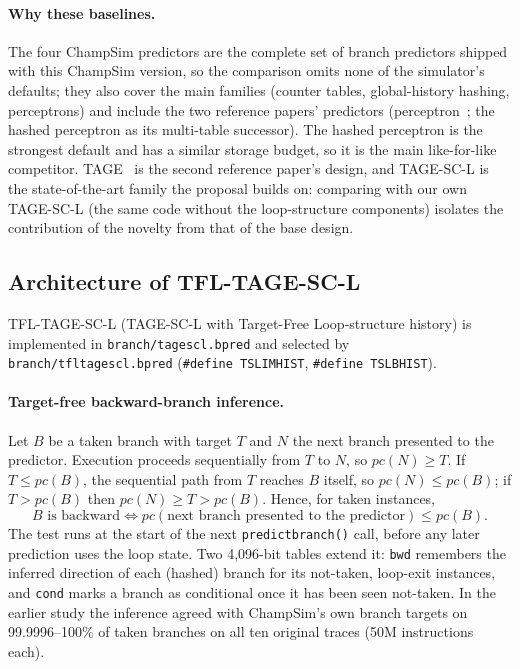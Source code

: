 \documentclass[11pt,a4paper]{article}
\newcommand{\code}[1]{\texttt{#1}}
\newcommand{\prop}{TFL-TAGE-SC-L}
\renewcommand{\_}{\textunderscore\allowbreak}
\begin{document}
\paragraph{Why these baselines.} The four ChampSim predictors are the complete set of branch predictors shipped with this ChampSim version, so the comparison omits none of the simulator's defaults; they also cover the main families (counter tables, global-history hashing, perceptrons) and include the two reference papers' predictors (perceptron~\cite{jimenez2001perceptron}; the hashed perceptron as its multi-table successor). The hashed perceptron is the strongest default and has a similar storage budget, so it is the main like-for-like competitor. TAGE~\cite{seznec2011newcase} is the second reference paper's design, and TAGE-SC-L is the state-of-the-art family the proposal builds on: comparing with our own TAGE-SC-L (the same code without the loop-structure components) isolates the contribution of the novelty from that of the base design.

\subsection{Architecture of \prop{}}\label{sec:arch}

\prop{} (TAGE-SC-L with Target-Free Loop-structure history) is implemented in \code{branch/tagescl.bpred} and selected by \code{branch/tfl\_tage\_scl.bpred} (\code{\#define TSL\_IMHIST}, \code{\#define TSL\_BHIST}).

\paragraph{Target-free backward-branch inference.} Let $B$ be a taken branch with target $T$ and $N$ the next branch presented to the predictor. Execution proceeds sequentially from $T$ to $N$, so $pc(N) \ge T$. If $T \le pc(B)$, the sequential path from $T$ reaches $B$ itself, so $pc(N) \le pc(B)$; if $T > pc(B)$ then $pc(N) \ge T > pc(B)$. Hence, for taken instances,
\[
B \text{ is backward} \iff pc(\text{next branch presented to the predictor}) \le pc(B).
\]
The test runs at the start of the next \code{predict\_branch()} call, before any later prediction uses the loop state. Two 4,096-bit tables extend it: \code{bwd} remembers the inferred direction of each (hashed) branch for its not-taken, loop-exit instances, and \code{cond} marks a branch as conditional once it has been seen not-taken. In the earlier study the inference agreed with ChampSim's own branch targets on 99.9996--100\% of taken branches on all ten original traces (50M instructions each).
\end{document}
